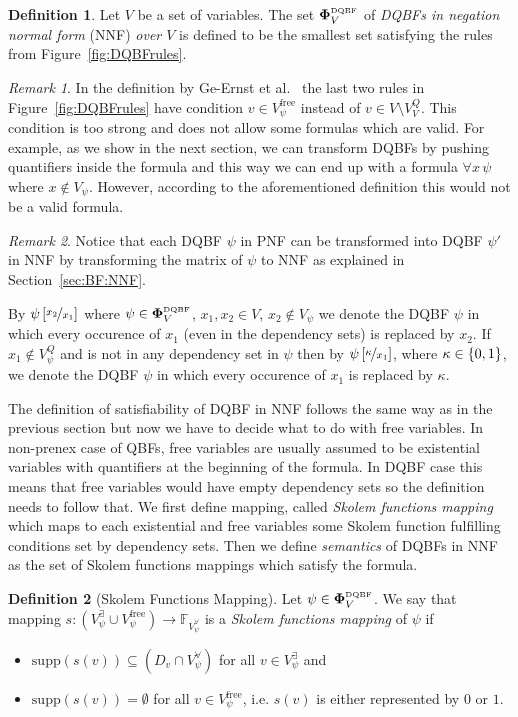 \documentclass[
  digital, %
  color,
  twoside, %
  table,   %
  nolof,     %
  nolot,     %
]{fithesis3}
\let\setbuilder\set
\newcommand{\simpleset}[1]{\{{#1}\}}
\renewcommand{\set}[1]{\normalexpandarg\IfSubStr{#1}{|}{\setbuilder{#1}}{\simpleset{#1}}}
\theoremstyle{definition}
\newtheorem{definition}{Definition}
\theoremstyle{remark}
\newtheorem*{remark}{Remark}
\newcommand{\substitute}[2]{\left[ \nicefrac{#2}{#1} \right]}
\newcommand{\DQBF}[1]{\mathbf{\Phi}_{#1}^{\normalfont{\text{\tiny DQBF}}}}
\newcommand{\BFuncs}[1]{\mathbb{F}_{#1}}
\newcommand{\evars}[1]{V_{#1}^{\exists}}
\newcommand{\uvars}[1]{V_{#1}^{\forall}}
\newcommand{\fvars}[1]{V_{#1}^{\mathrm{free}}}
\newcommand{\qvars}[1]{V_{#1}^{Q}}
\newcommand{\supp}[1]{\mathrm{supp}(#1)}
\newcommand{\itholds}{\,}
\begin{document}
\begin{definition}
  Let $V$ be a set of variables. The set $\DQBF{V}$ of \emph{DQBFs in negation normal form} (NNF) \emph{over $V$} is defined to be the smallest set satisfying the rules from Figure~\ref{fig:DQBFrules}.
\end{definition}
\begin{remark}
In the definition by Ge-Ernst et al.~\cite{HQSquantifierLocalisation} the last two rules in Figure~\ref{fig:DQBFrules} have condition $v \in \fvars{\psi}$ instead of $v \in V \setminus \qvars{V}$. This condition is too strong and does not allow some formulas which are valid. For example, as we show in the next section, we can transform DQBFs by pushing quantifiers inside the formula and this way we can end up with a formula $\forall x \itholds \psi$ where $x \not\in V_{\psi}$. However, according to the aforementioned definition this would not be a valid formula.
\end{remark}

\begin{remark}
Notice that each DQBF $\psi$ in PNF can be transformed into DQBF $\psi'$ in NNF by transforming the matrix of $\psi$ to NNF as explained in Section~\ref{sec:BF:NNF}.
\end{remark}

By $\psi\substitute{x_1}{x_2}$ where $\psi \in \DQBF{V}$, $x_1, x_2 \in V$, $x_2 \not\in V_{\psi}$ we denote the DQBF $\psi$ in which every occurence of $x_1$ (even in the dependency sets) is replaced by $x_2$. If $x_1 \not\in \qvars{\psi}$ and is not in any dependency set in $\psi$ then by $\psi\substitute{x_1}{\kappa}$, where $\kappa\in\set{0,1}$, we denote the DQBF $\psi$ in which every occurence of $x_1$ is replaced by $\kappa$.

The definition of satisfiability of DQBF in NNF follows the same way as in the previous section but now we have to decide what to do with free variables. In non-prenex case of QBFs, free variables are usually assumed to be existential variables with quantifiers at the beginning of the formula. In DQBF case this means that free variables would have empty dependency sets so the definition needs to follow that. We first define mapping, called \emph{Skolem functions mapping} which maps to each existential and free variables some Skolem function fulfilling conditions set by dependency sets. Then we define \emph{semantics} of DQBFs in NNF as the set of Skolem functions mappings which satisfy the formula.

\begin{definition}[Skolem Functions Mapping]
  Let $\psi \in \DQBF{V}$. We say that mapping $s\colon (\evars{\psi} \cup \fvars{\psi}) \to \BFuncs{\uvars{\psi}}$ is a \emph{Skolem functions mapping} of $\psi$ if
  \begin{itemize}
      \item $\supp{s(v)} \subseteq (D_v \cap \uvars{\psi})$ for all $v \in \evars{\psi}$ and
      \item $\supp{s(v)} = \emptyset$ for all $v \in \fvars{\psi}$, i.e. $s(v)$ is either represented by $0$ or $1$.
  \end{itemize}
\end{definition}
\end{document}
